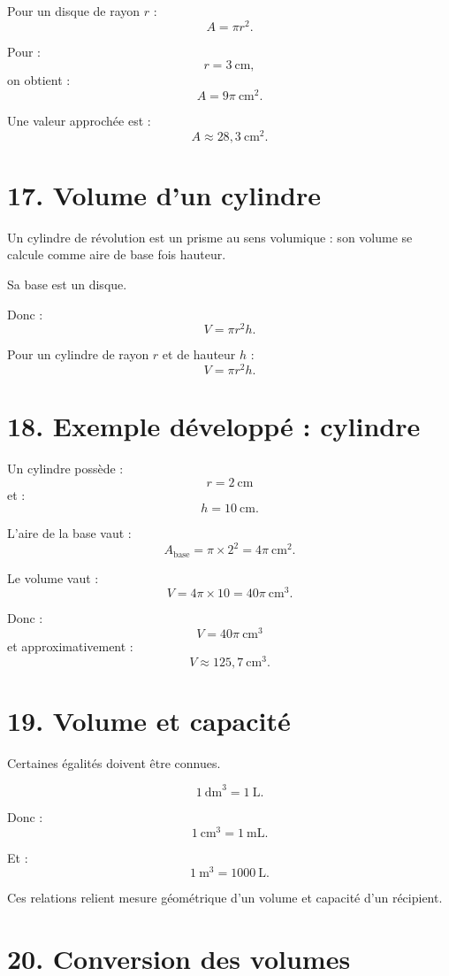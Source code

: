 Pour un disque de rayon $r$ :
\[
\boxed{A=\pi r^2}.
\]

Pour :
\[
r=3\ \text{cm},
\]
on obtient :
\[
A=9\pi\ \text{cm}^2.
\]

Une valeur approchée est :
\[
A\approx28{,}3\ \text{cm}^2.
\]

\section{17. Volume d'un cylindre}

Un cylindre de révolution est un prisme au sens volumique : son volume se calcule comme aire de base fois hauteur.

Sa base est un disque.

Donc :
\[
V=\pi r^2h.
\]

\begin{propriete}
Pour un cylindre de rayon $r$ et de hauteur $h$ :
\[
\boxed{V=\pi r^2h}.
\]
\end{propriete}

\section{18. Exemple développé : cylindre}

Un cylindre possède :
\[
r=2\ \text{cm}
\]
et :
\[
h=10\ \text{cm}.
\]

L'aire de la base vaut :
\[
A_{\text{base}}=\pi\times2^2=4\pi\ \text{cm}^2.
\]

Le volume vaut :
\[
V=4\pi\times10=40\pi\ \text{cm}^3.
\]

Donc :
\[
\boxed{V=40\pi\ \text{cm}^3}
\]
et approximativement :
\[
\boxed{V\approx125{,}7\ \text{cm}^3}.
\]

\section{19. Volume et capacité}

Certaines égalités doivent être connues.

\[
1\ \text{dm}^3=1\ \text{L}.
\]

Donc :
\[
1\ \text{cm}^3=1\ \text{mL}.
\]

Et :
\[
1\ \text{m}^3=1000\ \text{L}.
\]

Ces relations relient mesure géométrique d'un volume et capacité d'un récipient.

\section{20. Conversion des volumes}

